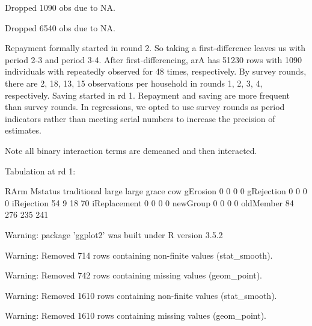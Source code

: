 \begin{Schunk}
\begin{Soutput}
Dropped 1090 obs due to NA.
\end{Soutput}
\begin{Soutput}
Dropped 6540 obs due to NA.
\end{Soutput}
\end{Schunk}
Repayment formally started in round 2. So taking a first-difference leaves us with period 2-3 and period 3-4. After first-differencing, \textsf{arA} has 51230 rows with 1090 individuals with repeatedly observed for 48 times, respectively. By survey rounds, there are 2, 18, 13, 15 observations per household in rounds 1, 2, 3, 4, respectively. Saving started in rd 1. Repayment and saving are more frequent than survey rounds. In regressions, we opted to use survey rounds as period indicators rather than meeting serial numbers to increase the precision of estimates.

Note all binary interaction terms are demeaned and then interacted.


Tabulation at rd 1:
\begin{Schunk}
\begin{Soutput}
              RArm
Mstatus        traditional large large grace cow
  gErosion               0     0           0   0
  gRejection             0     0           0   0
  iRejection            54     9          18  70
  iReplacement           0     0           0   0
  newGroup               0     0           0   0
  oldMember             84   276         235 241
\end{Soutput}
\end{Schunk}
\begin{Schunk}
\begin{Soutput}
Warning: package 'ggplot2' was built under R version 3.5.2
\end{Soutput}
\begin{Soutput}
Warning: Removed 714 rows containing non-finite values (stat_smooth).
\end{Soutput}
\begin{Soutput}
Warning: Removed 742 rows containing missing values (geom_point).
\end{Soutput}
\end{Schunk}
\begin{Schunk}
\begin{Soutput}
Warning: Removed 1610 rows containing non-finite values (stat_smooth).
\end{Soutput}
\begin{Soutput}
Warning: Removed 1610 rows containing missing values (geom_point).
\end{Soutput}
\end{Schunk}

